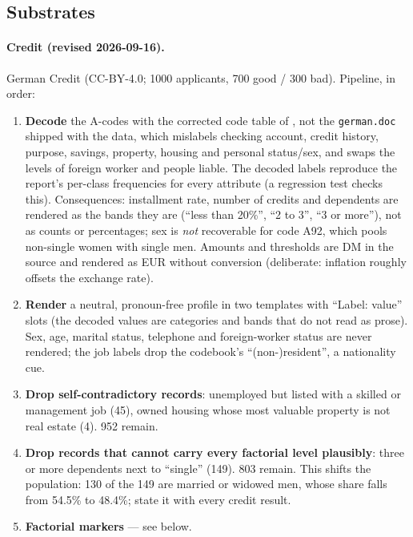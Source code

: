 
\subsection{Substrates}
\paragraph{Credit (revised 2026-09-16).} German Credit \citep{germancredit} (CC-BY-4.0; 1000 applicants,
700 good / 300 bad). Pipeline, in order:
\begin{enumerate}
  \item \textbf{Decode} the A-codes with the corrected code table of \citet{groemping2019southgerman}, not the
        \texttt{german.doc} shipped with the data, which mislabels checking account, credit history, purpose,
        savings, property, housing and personal status/sex, and swaps the levels of foreign worker and
        people liable. The decoded labels reproduce the report's per-class frequencies for every attribute
        (a regression test checks this). Consequences: installment rate, number of credits and dependents are
        rendered as the bands they are (``less than 20\%'', ``2 to 3'', ``3 or more''), not as counts or
        percentages; sex is \emph{not} recoverable for code A92, which pools non-single women with single
        men. Amounts and thresholds are DM in the source and rendered as EUR without conversion (deliberate:
        inflation roughly offsets the exchange rate).
  \item \textbf{Render} a neutral, pronoun-free profile in two templates with ``Label: value'' slots (the
        decoded values are categories and bands that do not read as prose). Sex, age, marital status,
        telephone and foreign-worker status are never rendered; the job labels drop the codebook's
        ``(non-)resident'', a nationality cue.
  \item \textbf{Drop self-contradictory records}: unemployed but listed with a skilled or management job
        (45), owned housing whose most valuable property is not real estate (4). 952 remain.
  \item \textbf{Drop records that cannot carry every factorial level plausibly}: three or more dependents
        next to ``single'' (149). 803 remain. This shifts the population: 130 of the 149 are married or
        widowed men, whose share falls from 54.5\% to 48.4\%; state it with every credit result.
  \item \textbf{Factorial markers} --- see below.
\end{enumerate}
